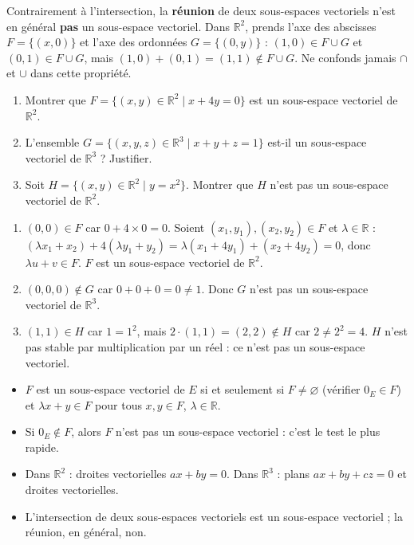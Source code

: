 \documentclass[11pt]{article}
\begin{document}
\begin{attention}
Contrairement à l'intersection, la \textbf{réunion} de deux sous-espaces vectoriels n'est en général \textbf{pas} un sous-espace vectoriel. Dans $\mathbb{R}^2$, prends l'axe des abscisses $F = \{(x,0)\}$ et l'axe des ordonnées $G = \{(0,y)\}$ : $(1,0) \in F \cup G$ et $(0,1) \in F \cup G$, mais $(1,0) + (0,1) = (1,1) \notin F \cup G$. Ne confonds jamais $\cap$ et $\cup$ dans cette propriété.
\end{attention}

\begin{exercice}
\begin{enumerate}
\item Montrer que $F = \{(x,y) \in \mathbb{R}^2 \mid x + 4y = 0\}$ est un sous-espace vectoriel de $\mathbb{R}^2$.
\item L'ensemble $G = \{(x,y,z) \in \mathbb{R}^3 \mid x + y + z = 1\}$ est-il un sous-espace vectoriel de $\mathbb{R}^3$ ? Justifier.
\item Soit $H = \{(x,y) \in \mathbb{R}^2 \mid y = x^2\}$. Montrer que $H$ n'est pas un sous-espace vectoriel de $\mathbb{R}^2$.
\end{enumerate}
\end{exercice}

\begin{corrige}[Exercice]
\begin{enumerate}
\item $(0,0) \in F$ car $0 + 4 \times 0 = 0$. Soient $(x_1,y_1), (x_2,y_2) \in F$ et $\lambda \in \mathbb{R}$ : $(\lambda x_1 + x_2) + 4(\lambda y_1 + y_2) = \lambda(x_1 + 4y_1) + (x_2 + 4y_2) = 0$, donc $\lambda u + v \in F$. $F$ est un sous-espace vectoriel de $\mathbb{R}^2$.
\item $(0,0,0) \notin G$ car $0 + 0 + 0 = 0 \neq 1$. Donc $G$ n'est pas un sous-espace vectoriel de $\mathbb{R}^3$.
\item $(1,1) \in H$ car $1 = 1^2$, mais $2 \cdot (1,1) = (2,2) \notin H$ car $2 \neq 2^2 = 4$. $H$ n'est pas stable par multiplication par un réel : ce n'est pas un sous-espace vectoriel.
\end{enumerate}
\end{corrige}

\begin{aretenir}
\begin{itemize}
\item $F$ est un sous-espace vectoriel de $E$ si et seulement si $F \neq \varnothing$ (vérifier $0_E \in F$) et $\lambda x + y \in F$ pour tous $x, y \in F$, $\lambda \in \mathbb{R}$.
\item Si $0_E \notin F$, alors $F$ n'est pas un sous-espace vectoriel : c'est le test le plus rapide.
\item Dans $\mathbb{R}^2$ : droites vectorielles $ax + by = 0$. Dans $\mathbb{R}^3$ : plans $ax + by + cz = 0$ et droites vectorielles.
\item L'intersection de deux sous-espaces vectoriels est un sous-espace vectoriel ; la réunion, en général, non.
\end{itemize}
\end{aretenir}
\end{document}
